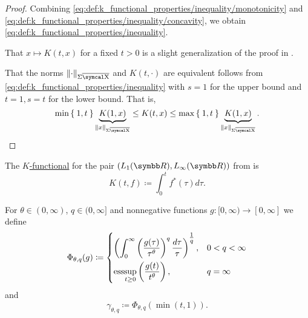 \begin{proof}
  Combining \eqref{eq:def:k_functional_properties/inequality/monotonicity} and \eqref{eq:def:k_functional_properties/inequality/concavity}, we obtain \eqref{eq:def:k_functional_properties/inequality}.

   That \( x \mapsto K(t, x) \) for a fixed \( t > 0 \) is a slight generalization of the proof in .

  That the norms \( \Norm{\cdot}_{\Sigma \Ol{\CX}} \) and \( K(t, \cdot) \) are equivalent follows from \eqref{eq:def:k_functional_properties/inequality} with \( s = 1 \) for the upper bound and \( t = 1, s = t \) for the lower bound. That is,
  \begin{equation*}
    \min\Set{1, t} \underbrace{K(1, x)}_{\Norm{x}_{\Sigma \Ol{\CX}}} \leq K(t, x) \leq \max\Set{1, t} \underbrace{K(1, x)}_{\Norm{x}_{\Sigma \Ol{\CX}}}.
  \end{equation*}
\end{proof}

\begin{example}\label{thm:lp_interpolation_spaces/k_functional}
  The \hyperref[def:k_functional]{\( K \)-functional} for the pair \( (L_1(\BR), L_\infty(\BR)) \) from  is
  \begin{equation*}
    K(t, f) \coloneqq \int_0^t f^*(\tau) d\tau.
  \end{equation*}
\end{example}

\begin{definition}\label{def:lorenz_quasinorm}
  For \( \theta \in (0, \infty) \), \( q \in (0, \infty] \) and nonnegative functions \( g: [0, \infty) \to [0, \infty] \) we define
  \begin{equation}\label{eq:def:lorenz_quasinorm}
    \Phi_{\theta,q}(g) \coloneqq \begin{dcases}
      \left( \int_0^\infty \left( \frac {g(\tau)} {\tau^\theta} \right)^q \frac {d\tau} \tau \right)^{\tfrac 1 q}, &0 < q < \infty \\
      \operatorname{ess}\!\sup_{t \geq 0} \left( \frac {g(t)} {t^\theta} \right),                                                &q = \infty
    \end{dcases}
  \end{equation}
  and
  \begin{equation}\label{eq:def:lorenz_quasinorm/gamma}
    \gamma_{\theta,q} \coloneqq \Phi_{\theta,q}(\min(t, 1)).
  \end{equation}
\end{definition}

